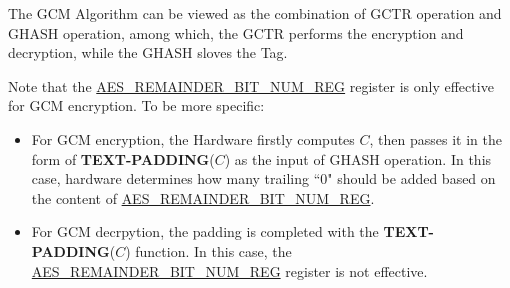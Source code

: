 \documentclass[main\_\_EN.tex]{subfiles}
\begin{document}
The GCM Algorithm can be viewed as the combination of GCTR operation and GHASH operation, among which, the GCTR performs the encryption and decryption, while the GHASH sloves the Tag.

Note that the \hyperref[regdesc:AESREMAINDERBITNUMREG]{AES\_REMAINDER\_BIT\_NUM\_REG} register is only effective for GCM encryption. To be more specific:

\begin{itemize}
    \item For GCM encryption, the Hardware firstly computes $C$, then passes it in the form of {\bfseries TEXT-PADDING}($C$) as the input of GHASH operation. In this case, hardware determines how many trailing ``0" should be added based on the content of \hyperref[regdesc:AESREMAINDERBITNUMREG]{AES\_REMAINDER\_BIT\_NUM\_REG}.
    \item For GCM decrpytion, the padding is completed with the {\bfseries TEXT-PADDING}($C$) function. In this case, the \hyperref[regdesc:AESREMAINDERBITNUMREG]{AES\_REMAINDER\_BIT\_NUM\_REG} register is not effective.
\end{itemize}
\end{document}
